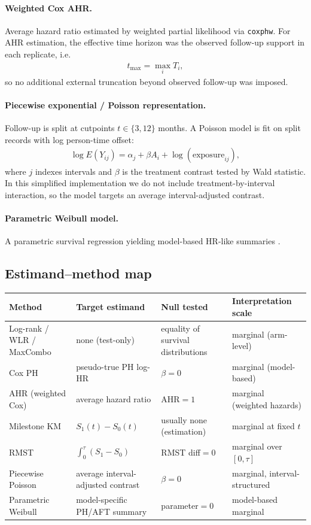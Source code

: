 \documentclass[11pt]{article}
\begin{document}
\paragraph{Weighted Cox AHR.}
Average hazard ratio estimated by weighted partial likelihood \citep{schemper2009} via \texttt{coxphw}. For AHR estimation, the effective time horizon was the observed follow-up support in each replicate, i.e.
\begin{align}
t_{\max}=\max_i T_i,
\end{align}
so no additional external truncation beyond observed follow-up was imposed.

\paragraph{Piecewise exponential / Poisson representation.}
Follow-up is split at cutpoints $t\in\{3,12\}$ months. A Poisson model is fit on split records with log person-time offset:
\begin{align}
\log E(Y_{ij}) = \alpha_j + \beta A_i + \log(\text{exposure}_{ij}),
\end{align}
where $j$ indexes intervals and $\beta$ is the treatment contrast tested by Wald statistic. In this simplified implementation we do not include treatment-by-interval interaction, so the model targets an average interval-adjusted contrast.

\paragraph{Parametric Weibull model.}
A parametric survival regression yielding model-based HR-like summaries \citep{royston2002}.

\subsection{Estimand--method map}
\begin{center}
\small
\begin{tabularx}{\textwidth}{p{3.1cm}p{3.2cm}p{3.5cm}p{3.0cm}}
\toprule
Method & Target estimand & Null tested & Interpretation scale \\
\midrule
Log-rank / WLR / MaxCombo & none (test-only) & equality of survival distributions & marginal (arm-level) \\
Cox PH & pseudo-true PH log-HR & $\beta=0$ & marginal (model-based) \\
AHR (weighted Cox) & average hazard ratio & AHR$=1$ & marginal (weighted hazards) \\
Milestone KM & $S_1(t)-S_0(t)$ & usually none (estimation) & marginal at fixed $t$ \\
RMST & $\int_0^{\tau}(S_1-S_0)$ & RMST diff$=0$ & marginal over $[0,\tau]$ \\
Piecewise Poisson & average interval-adjusted contrast & $\beta=0$ & marginal, interval-structured \\
Parametric Weibull & model-specific PH/AFT summary & parameter$=0$ & model-based marginal \\
\bottomrule
\end{tabularx}
\end{center}
\end{document}
